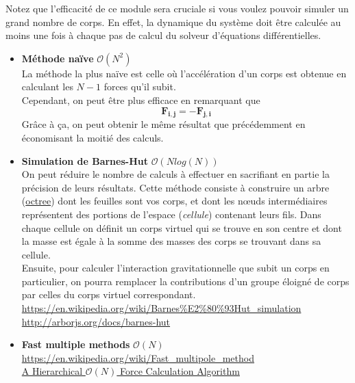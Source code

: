 \documentclass{article}
\newcommand{\myvec}[1]{\ensuremath{\mathbf{#1}}}
\begin{document}
Notez que l'efficacité de ce module sera cruciale si vous voulez pouvoir simuler un grand nombre de corps. En effet, la dynamique du système doit être calculée au moins une fois à chaque pas de calcul du solveur d'équations différentielles.

\begin{itemize}
    \item \textbf{Méthode naïve} $\mathcal{O}(N^2)$ \\
    La méthode la plus naïve est celle où l'accélération d'un corps est obtenue en calculant les $N-1$ forces qu'il subit.\\
    Cependant, on peut être plus efficace en remarquant que
    \begin{equation*}
    \myvec{F_{i,j}} = - \myvec{F_{j,i}}
    \end{equation*}
    Grâce à ça, on peut obtenir le même résultat que précédemment en économisant la moitié des calculs.
    \item \textbf{Simulation de Barnes-Hut} $\mathcal{O}(N log(N))$ \\
    On peut réduire le nombre de calculs à effectuer en sacrifiant en partie la précision de leurs résultats. Cette méthode consiste à construire un arbre (\href{https://en.wikipedia.org/wiki/Octree}{octree}) dont les feuilles sont vos corps, et dont les nœuds intermédiaires représentent des portions de l'espace (\emph{cellule}) contenant leurs fils. Dans chaque cellule on définit un corps virtuel qui se trouve en son centre et dont la masse est égale à la somme des masses des corps se trouvant dans sa cellule. \\
    Ensuite, pour calculer l'interaction gravitationnelle que subit un corps en particulier, on pourra remplacer la contributions d'un groupe éloigné de corps par celles du corps virtuel correspondant. \\
    \url{https://en.wikipedia.org/wiki/Barnes\%E2\%80\%93Hut_simulation}\\
    \url{http://arborjs.org/docs/barnes-hut}
    \item \textbf{Fast multiple methods} $\mathcal{O}(N)$ \\
    \url{https://en.wikipedia.org/wiki/Fast_multipole_method}\\
    \href{https://arxiv.org/pdf/astro-ph/0202512.pdf}{A Hierarchical $\mathcal{O}(N)$ Force Calculation Algorithm}
\end{itemize}

\vspace{1em}
\end{document}
